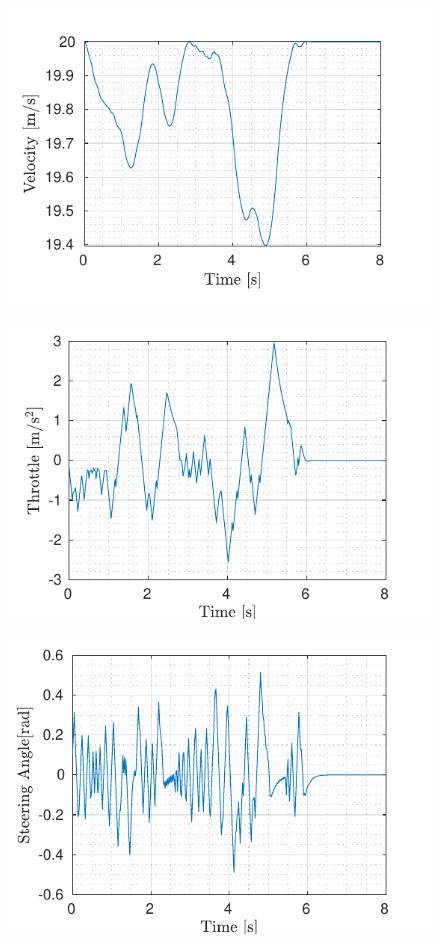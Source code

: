 \begin{figure}[!t]
\begin{minipage}[t]{0.5\textwidth}
		\includegraphics[width=\textwidth]{../../MATLAB/6_obstacles/figure/VelocityVsTime.pdf}
		\subcaption{}\label{fig:velocity_six_moving}
	\end{minipage}
	\begin{minipage}[t]{0.5\textwidth}
		\includegraphics[width=\textwidth]{../../MATLAB/6_obstacles/figure/ThrottleVsTime.pdf}
		\subcaption{}\label{fig:throttle_six_moving}
	\end{minipage}
	\begin{minipage}[t]{0.5\textwidth}
		\includegraphics[width=\textwidth]{../../MATLAB/6_obstacles/figure/SteeringAngleVsTime.pdf}

\end{minipage}
\end{figure}
